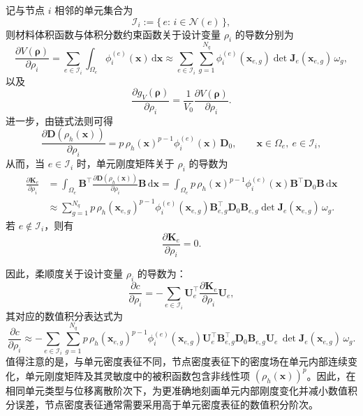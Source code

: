 记与节点 $i$ 相邻的单元集合为
\[
\mathcal I_i:=\{\,e:\,i\in\mathcal N(e)\,\},
\]
则材料体积函数与体积分数约束函数关于设计变量 $\rho_i$ 的导数分别为
\[
\frac{\partial V(\boldsymbol\rho)}{\partial \rho_i} = \sum_{e\in\mathcal I_i} \int_{\Omega_e}\phi_i^{(e)}(\boldsymbol{x})\,\mathrm d\boldsymbol x \approx \sum_{e\in\mathcal I_i}\sum_{g=1}^{N_q} \phi_i^{(e)}(\boldsymbol{x}_{e,g}) \det\boldsymbol J_e(\boldsymbol{x}_{e,g})\,\omega_g,
\]
以及
\[
\frac{\partial g_V(\boldsymbol\rho)}{\partial \rho_i} = \frac{1}{V_0}\frac{\partial V(\boldsymbol\rho)}{\partial \rho_i}.
\]
进一步，由链式法则可得
\[
\frac{\partial \boldsymbol D(\rho_h(\boldsymbol{x}))}{\partial \rho_i} = p\,\rho_h(\boldsymbol{x})^{p-1}\phi_i^{(e)}(\boldsymbol{x})\,\boldsymbol D_0, \qquad \boldsymbol{x}\in\Omega_e,\ e\in\mathcal I_i,
\]
从而，当 $e\in\mathcal I_i$ 时，单元刚度矩阵关于 $\rho_i$ 的导数为
\[
\begin{aligned}
	\frac{\partial\boldsymbol{K}_e}{\partial\rho_i} 
	&= \int_{\Omega_e} \boldsymbol B^{\top} \frac{\partial \boldsymbol D(\rho_h(\boldsymbol{x}))}{\partial \rho_i} \boldsymbol B\,\mathrm d\boldsymbol x = \int_{\Omega_e} p\,\rho_h(\boldsymbol{x})^{p-1}\phi_i^{(e)}(\boldsymbol{x}) \boldsymbol B^{\top}\boldsymbol D_0\boldsymbol B\,\mathrm d\boldsymbol x\\
	&\approx \sum_{g=1}^{N_q} p\,\rho_h(\boldsymbol{x}_{e,g})^{p-1} \phi_i^{(e)}(\boldsymbol{x}_{e,g}) \boldsymbol B_{e,g}^{\top}\boldsymbol D_0\boldsymbol B_{e,g} \det\boldsymbol J_e(\boldsymbol{x}_{e,g})\,\omega_g.
\end{aligned}
\]
若 $e\notin\mathcal I_i$，则有
\[
\frac{\partial \boldsymbol K_e}{\partial \rho_i}=0.
\]

因此，柔顺度关于设计变量 $\rho_i$ 的导数为：
\begin{equation} \label{eq:ch3_sens_node_compliance}
	\frac{\partial c}{\partial \rho_i} = -\sum_{e\in\mathcal I_i} \boldsymbol U_e^{\top} \frac{\partial \boldsymbol K_e}{\partial \rho_i} \boldsymbol U_e,
\end{equation}
其对应的数值积分表达式为
\[
\frac{\partial c}{\partial \rho_i} \approx -\sum_{e\in\mathcal I_i}\sum_{g=1}^{N_q} p\,\rho_h(\boldsymbol{x}_{e,g})^{p-1} \phi_i^{(e)}(\boldsymbol{x}_{e,g}) \boldsymbol{U}_e^{\top} \boldsymbol{B}_{e,g}^{\top}\boldsymbol{D}_0\boldsymbol{B}_{e,g} \boldsymbol{U}_e\, \det\boldsymbol{J}_e(\boldsymbol{x}_{e,g})\,\omega_g.
\]
值得注意的是，与单元密度表征不同，节点密度表征下的密度场在单元内部连续变化，单元刚度矩阵及其灵敏度中的被积函数包含非线性项 $(\rho_h(\boldsymbol{x}))^p$。因此，在相同单元类型与位移离散阶次下，为更准确地刻画单元内部刚度变化并减小数值积分误差，节点密度表征通常需要采用高于单元密度表征的数值积分阶次。

